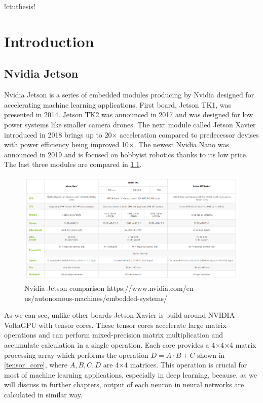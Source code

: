 \documentclass[twoside]{ctuthesis}
\theoremstyle{plain}
\theoremstyle{definition}
\theoremstyle{note}
\begin{document}
\renewcommand \ctulstsep {0pt}
\newcommand\ctuclsname{\leavevmode\unhcopy\ctuclsnamebox}
\newsavebox\ctuclsnamebox
\begin{lrbox}{\ctuclsnamebox}
\ctulst!ctuthesis!
\end{lrbox}
\maketitle
\chapter{Introduction}
\section{Nvidia Jetson}
\label{section:nvidia_jetson}
Nvidia Jetson is a series of embedded modules producing by Nvidia designed for accelerating machine learning applications. First board, Jetson TK1, was presented in 2014. Jetson TK2 was announced in 2017  and was designed for low power systems like smaller camera drones. The next module called Jetson Xavier introduced in 2018 brings up to 20$\times$ acceleration compared to predecessor devises with power efficiency being improved 10$\times$. The newest Nvidia Nano was announced in 2019 and is focused on hobbyist robotics thanks to its low price. The last three modules are compared in \ref{jetson_comparison}.
\begin{figure}[h]
\caption{Nvidia Jetson comparison https://www.nvidia.com/en-us/autonomous-machines/embedded-systems/}
\label{jetson_comparison}
\includegraphics[width=\textwidth]{images/introduction/compare_jetson.png}
\end{figure}
As we can see, unlike other boards Jetson Xavier is build around NVIDIA Volta\texttrademark GPU with tensor cores. These tensor cores accelerate large matrix operations and can perform mixed-precision matrix multiplication and accumulate calculation in a single operation. Each core  provides a 4$\times$4$\times$4 matrix processing array which performs the operation $D = A \cdot B+C$ shown in \ref{tensor_core}, where $A,B,C,D$ are 4$\times$4 matrices. This operation is crucial for most of machine learning applications, especially in deep learning, because, as we will discuss in further chapters, output of each neuron in neural networks are calculated in similar way. 
\end{document}
